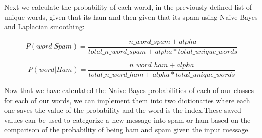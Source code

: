  Next we calculate the probability of each world, in the previously defined list of unique words, given that its ham and then given that its spam using Naive Bayes and Laplacian smoothing:
 
 \[ P(word|Spam) = \frac{n\_word\_spam + alpha }{total\_n\_word\_spam+ alpha*total\_unique\_words} \]

\[ P(word|Ham) = \frac{n\_word\_ham + alpha }{total\_n\_word\_ham + alpha*total\_unique\_words} \] 

Now that we have calculated the Naive Bayes probabilities of each of our classes for each of our words, we can implement them into two dictionaries where each one saves the value of the probability and the word is the index.These saved values can be used to categorize a new message into spam or ham based on the comparison of the probability of being ham and spam given the input message.
